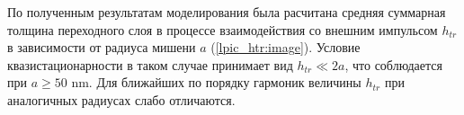 
По полученным результатам моделирования была расчитана средняя суммарная толщина переходного слоя в процессе взаимодействия со внешним импульсом $h_{tr}$ в зависимости от радиуса мишени $a$ (\autoref{lpic_htr:image}). Условие квазистационарности в таком случае принимает вид $h_{tr} \ll 2a$, что соблюдается при $a \geq 50$ nm. Для ближайших по порядку гармоник величины $h_{tr}$ при аналогичных радиусах слабо отличаются.
